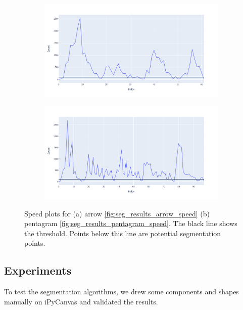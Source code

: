 \begin{figure}
	\begin{subfigure}{0.45\textwidth}
		\centering
		\includegraphics[scale=0.25]{./img/seg_speed_arrow}
		\caption{}
	\end{subfigure}
	\hfill
	\begin{subfigure}{0.45\textwidth}
		\centering
		\includegraphics[scale=0.25]{./img/seg_speed_pentagram}
		\caption{}
	\end{subfigure}
	\caption{Speed plots for (a) arrow \ref{fig:seg_results_arrow_speed} (b) pentagram \ref{fig:seg_results_pentagram_speed}. The black line shows the threshold. Points below this line are potential segmentation points.}
	\label{fig:seg_speed_plots}
\end{figure}

\subsection{Experiments}
\label{sec:seg_experiments}
To test the segmentation algorithms, we drew some components and shapes manually on iPyCanvas and validated the results.\\

